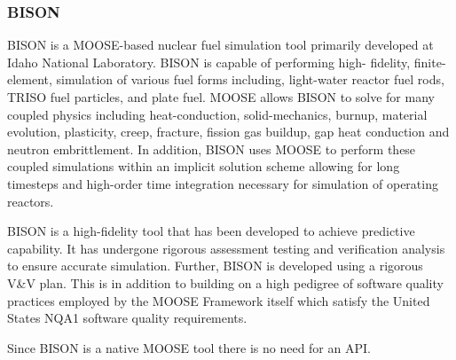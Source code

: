 \subsubsection{BISON}

BISON is a MOOSE-based \cite{hales2013triso} nuclear fuel simulation tool primarily developed at Idaho National Laboratory.
BISON is capable of performing high-
fidelity, finite-element, simulation of various fuel forms including,
light-water reactor fuel rods, TRISO fuel particles, and plate fuel. MOOSE allows BISON to solve for many
coupled physics including heat-conduction, solid-mechanics, burnup, material evolution, plasticity, creep,
fracture, fission gas buildup, gap heat conduction and neutron embrittlement. In addition, BISON uses
MOOSE to perform these coupled simulations within an implicit solution scheme allowing for long timesteps
and high-order time integration necessary for simulation of operating reactors.

BISON is a high-fidelity tool that has been developed to achieve predictive capability. It has undergone
rigorous assessment testing and verification analysis to ensure accurate simulation. Further, BISON is
developed using a rigorous V&V plan. This is in addition to building on a high pedigree of software quality
practices employed by the MOOSE Framework itself which satisfy the United States NQA1 software quality
requirements.

Since BISON is a native MOOSE tool there is no need for an API.
